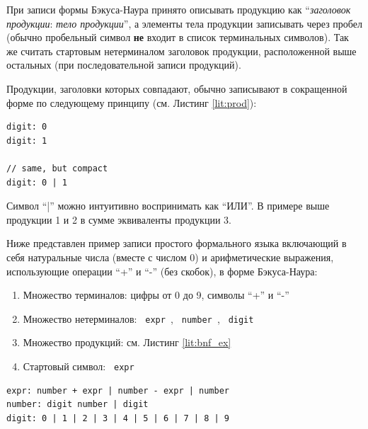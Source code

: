 При записи формы Бэкуса-Наура принято описывать продукцию как \enquote{\textit{заголовок продукции}: \textit{тело продукции}}, а элементы тела продукции записывать через пробел (обычно пробельный символ \textbf{не} входит в список терминальных символов). Так же считать стартовым нетерминалом заголовок продукции, расположенной выше остальных (при последовательной записи продукций).

Продукции, заголовки которых совпадают, обычно записывают в сокращенной форме по следующему принципу (см. Листинг \ref{lit:prod}):

\begin{code}
    \label{lit:prod}
    \begin{verbatim}
digit: 0
digit: 1

// same, but compact
digit: 0 | 1
    \end{verbatim}
\end{code}

Символ \enquote{|} можно интуитивно воспринимать как \enquote{ИЛИ}. В примере выше продукции 1 и 2 в сумме эквиваленты продукции 3.

Ниже представлен пример записи простого формального языка включающий в себя натуральные числа (вместе с числом 0) и арифметические выражения, использующие операции \enquote{+} и \enquote{-} (без скобок), в форме Бэкуса-Наура: 
\begin{enumerate}
    \item Множество терминалов: цифры от 0 до 9, символы \enquote{+} и \enquote{-}
    \item Множество нетерминалов: \texttt{ expr }, \texttt{ number }, \texttt{ digit }
    \item Множество продукций: см. Листинг \ref{lit:bnf_ex}
    \item Стартовый символ: \texttt{ expr }
\end{enumerate}

\begin{code}
    \label{lit:bnf_ex}
    \begin{verbatim}
expr: number + expr | number - expr | number
number: digit number | digit
digit: 0 | 1 | 2 | 3 | 4 | 5 | 6 | 7 | 8 | 9
    \end{verbatim}
\end{code}

